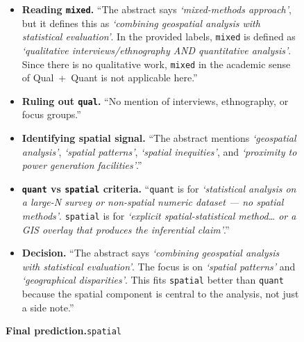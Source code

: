 \begin{figure}[t]
\begin{tcbraster}[
    raster columns=2,
    raster equal height=rows,
    raster column skip=8pt,
    raster row skip=4pt,
  ]
  \begin{tcolorbox}[
    enhanced,
    colback=green!2,
    colframe=green!40!black!55,
    boxrule=0.4pt, arc=2pt,
    left=8pt, right=8pt, top=6pt, bottom=6pt,
    title={\textsc{v3 schema} (methods\_04.csv) --- 7 categories, sharpened},
    fonttitle=\small\bfseries,
    fontupper=\small,
  ]
  \begin{itemize}\setlength\itemsep{2pt}
  \item \textbf{Reading \texttt{mixed}.} ``The abstract says \emph{`mixed-methods approach'}, but it defines this as \emph{`combining geospatial analysis with statistical evaluation'}. In the provided labels, \texttt{mixed} is defined as \emph{`qualitative interviews/ethnography AND quantitative analysis'}. Since there is no qualitative work, \texttt{mixed} in the academic sense of Qual~+~Quant is not applicable here.''
  \item \textbf{Ruling out \texttt{qual}.} ``No mention of interviews, ethnography, or focus groups.''
  \item \textbf{Identifying spatial signal.} ``The abstract mentions \emph{`geospatial analysis'}, \emph{`spatial patterns'}, \emph{`spatial inequities'}, and \emph{`proximity to power generation facilities'}.''
  \item \textbf{\texttt{quant} vs \texttt{spatial} criteria.} ``\texttt{quant} is for \emph{`statistical analysis on a large-N survey or non-spatial numeric dataset --- no spatial methods'}. \texttt{spatial} is for \emph{`explicit spatial-statistical method\dots{} or a GIS overlay that produces the inferential claim'}.''
  \item \textbf{Decision.} ``The abstract says \emph{`combining geospatial analysis with statistical evaluation'}. The focus is on \emph{`spatial patterns'} and \emph{`geographical disparities'}. This fits \texttt{spatial} better than \texttt{quant} because the spatial component is central to the analysis, not just a side note.''
  \end{itemize}

  \medskip
  \textbf{Final prediction.}\quad\texttt{spatial}
  \end{tcolorbox}
  \end{tcbraster}


\end{figure}
